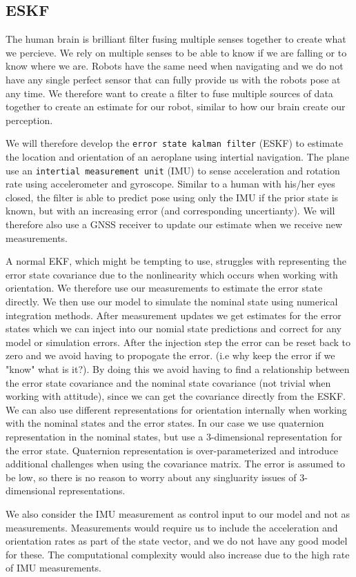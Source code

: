 \subsection{ESKF}
The human brain is brilliant filter fusing multiple senses together to create what we percieve. We rely on multiple senses to be able to know if we are falling or to know where we are. 
Robots have the same need when navigating and we do not have any single perfect sensor that can fully provide us with the robots pose at any time. We therefore want to create a filter to fuse multiple sources of data together to create an estimate for our robot, similar to how our brain create our perception.

We will therefore develop the \texttt{error state kalman filter} (ESKF) to estimate the location and orientation of an aeroplane using intertial navigation. The plane use an \texttt{intertial measurement unit} (IMU) to sense acceleration and rotation rate using accelerometer and gyroscope. Similar to a human with his/her eyes closed, the filter is able to predict pose using only the IMU if the prior state is known, but with an increasing error (and corresponding uncertianty). We will therefore also use a GNSS receiver to update our estimate when we receive new measurements. 

A normal EKF, which might be tempting to use, struggles with representing the error state covariance due to the nonlinearity which occurs when working with orientation. We therefore use our measurements to estimate the error state directly. We then use our model to simulate the nominal state using numerical integration methods. After measurement updates we get estimates for the error states which we can inject into our nomial state predictions and correct for any model or simulation errors. After the injection step the error can be reset back to zero and we avoid having to propogate the error. (i.e why keep the error if we "know" what is it?). By doing this we avoid having to find a relationship between the error state covariance and the nominal state covariance (not trivial when working with attitude), since we can get the covariance directly from the ESKF. We can also use different representations for orientation internally when working with the nominal states and the error states. In our case we use quaternion representation in the nominal states, but use a 3-dimensional representation for the error state. Quaternion representation is over-parameterized and introduce additional challenges when using the covariance matrix. The error is assumed to be low, so there is no reason to worry about any singluarity issues of 3-dimensional representations. 

We also consider the IMU measurement as control input to our model and not as measurements. Measurements would require us to include the acceleration and orientation rates as part of the state vector, and we do not have any good model for these. The computational complexity would also increase due to the high rate of IMU measurements.